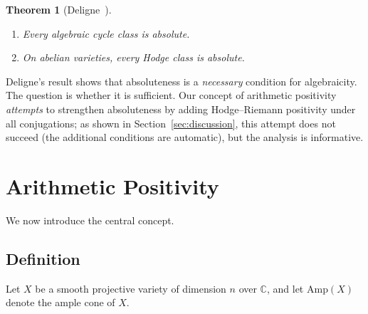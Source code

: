 \documentclass[aps,prd,twocolumn,superscriptaddress,nofootinbib]{revtex4-2}
\newtheorem{theorem}{Theorem}[section]
\theoremstyle{definition}
\theoremstyle{remark}
\begin{document}
\begin{theorem}[Deligne~\cite{Deligne1982}]
\label{thm:deligne_absolute}
\begin{enumerate}
\item Every algebraic cycle class is absolute.
\item On abelian varieties, every Hodge class is absolute.
\end{enumerate}
\end{theorem}

Deligne's result shows that absoluteness is a \textit{necessary} condition for algebraicity. The question is whether it is sufficient. Our concept of arithmetic positivity \textit{attempts} to strengthen absoluteness by adding Hodge--Riemann positivity under all conjugations; as shown in Section~\ref{sec:discussion}, this attempt does not succeed (the additional conditions are automatic), but the analysis is informative.


\section{Arithmetic Positivity}
\label{sec:arithmetic_positivity}

We now introduce the central concept.

\subsection{Definition}

Let $X$ be a smooth projective variety of dimension $n$ over $\mathbb{C}$, and let $\mathrm{Amp}(X)$ denote the ample cone of $X$.
\end{document}
